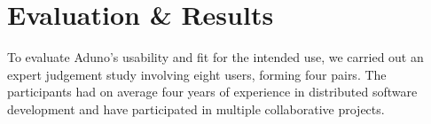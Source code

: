 \documentclass[conference]{IEEEtran}
\begin{document}
%
%

\section{Evaluation \& Results}
\label{sec:evaluation}

To evaluate Aduno's usability and fit for the intended use, we carried out an expert judgement study involving eight users, forming four pairs. The participants had on average four years of experience in distributed software development and have participated in multiple collaborative projects.


\end{document}
